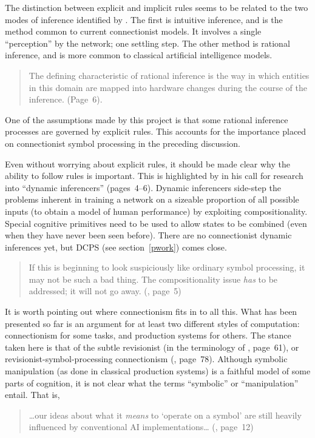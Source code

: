 The distinction between explicit and implicit rules seems to be
related to the two modes of inference identified by
. The first is intuitive inference, and is the method
common to current connectionist models.  It involves a single
``perception'' by the network; one settling step.  The other method is
rational inference, and is more common to classical artificial
intelligence models.
\begin{quotation}\small
The defining characteristic of rational inference is the way in which
entities in this domain are mapped into hardware changes during the
course of the inference. (Page~6).
\end{quotation}
One of the assumptions made by this project is that some rational
inference processes are governed by explicit rules. This accounts for
the importance placed on connectionist symbol processing in the
preceding discussion.


Even without worrying about explicit rules, it should be made clear
why the ability to follow rules is important. This is highlighted by
 in his call for research into ``dynamic inferencers''
(pages~4--6). Dynamic inferencers side-step the problems inherent in
training a network on a sizeable proportion of all possible inputs (to
obtain a model of human performance) by exploiting compositionality.
Special cognitive primitives need to be used to allow states to be
combined (even when they have never been seen before).  There are no
connectionist dynamic inferences yet, but DCPS (see
section~\ref{pwork}) comes close.
\begin{quotation}\small
If this is beginning to look suspiciously like ordinary symbol
processing, it may not be such a bad thing.  The compositionality
issue {\em has} to be addressed; it will not go away.
\flushright (, page~5)
\end{quotation}

It is worth pointing out where connectionism fits in to all this. What
has been presented so far is an argument for at least two different
styles of computation: connectionism for some tasks, and production
systems for others.  The stance taken here is that of the subtle
revisionist (in the terminology of , page~61), or
revisionist-symbol-processing connectionism (,
page~78). Although symbolic manipulation (as done in classical
production systems) is a faithful model of some parts of cognition, it
is not clear what the terms ``symbolic'' or ``manipulation'' entail.
That is,
\begin{quotation}\small
\ldots our ideas about what it {\em means} to `operate on a
symbol' are still heavily influenced by conventional AI
implementations\ldots
\flushright (, page~12)
\end{quotation}

